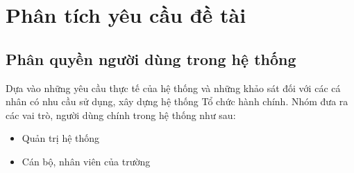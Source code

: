 \section{Phân tích yêu cầu đề tài}
\subsection{Phân quyền người dùng trong hệ thống}
\indent Dựa vào những yêu cầu thực tế của hệ thống và những khảo sát đối với các cá nhân có nhu cầu sử dụng, xây dựng hệ thống Tổ chức hành chính. Nhóm đưa ra các vai trò, người dùng chính trong hệ thống như sau:
\begin{itemize}
    \item Quản trị hệ thống
    \item Cán bộ, nhân viên của trường
    
\end{itemize}